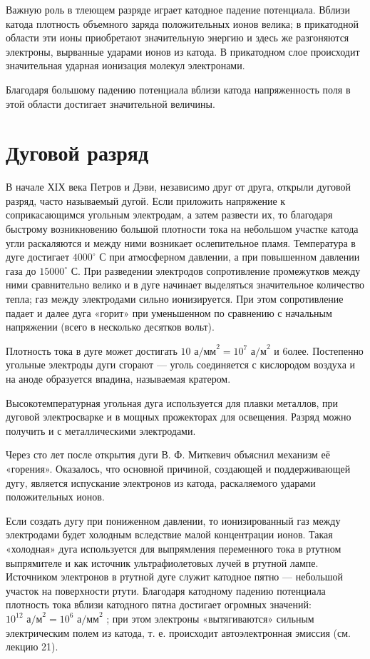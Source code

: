 \documentclass[a4paper,10pt]{book}
\begin{document}
Важную роль в тлеющем разряде играет катодное падение потенциала. Вблизи катода плотность объемного заряда положительных ионов велика; в прикатодной области эти ионы приобретают значительную энергию и здесь же разгоняются электроны, вырванные ударами ионов из катода. В прикатодном слое происходит значительная ударная ионизация молекул электронами.

Благодаря большому падению потенциала вблизи катода напряженность поля в этой области достигает значительной величины.

\section{Дуговой разряд}

В начале ХIХ века Петров и Дэви, независимо друг от друга, открыли дуговой разряд, часто называемый дугой. Если приложить напряжение к соприкасающимся угольным электродам, а затем развести их, то благодаря быстрому возникновению большой плотности тока на небольшом участке катода угли раскаляются и между ними возникает ослепительное пламя. Температура в дуге достигает $4000^{\circ}$ С при атмосферном давлении, а при повышенном давлении газа до $15 000^{\circ}$ С. При разведении электродов сопротивление промежутков между ними сравнительно велико и в дуге начинает выделяться значительное количество тепла; газ между электродами сильно ионизируется. При этом сопротивление падает и далее дуга «горит» при уменьшенном по сравнению с начальным напряжении (всего в несколько десятков вольт).

Плотность тока в дуге может достигать $10\textit{ а/мм}^2 = 10^7\textit{ а/м}^2$ и 6олее. Постепенно угольные электроды дуги сгорают — уголь соединяется с кислородом воздуха и на аноде образуется впадина, называемая кратером.

Высокотемпературная угольная дуга используется для плавки металлов, при дуговой электросварке и в мощных прожекторах для освещения. Разряд можно получить и с металлическими электродами.

Через сто лет после открытия дуги В. Ф. Миткевич объяснил механизм её «горения». Оказалось, что основной причиной, создающей и поддерживающей дугу, является испускание электронов из катода, раскаляемого ударами положительных ионов.

Если создать дугу при пониженном давлении, то ионизированный газ между электродами будет холодным вследствие малой концентрации ионов. Такая «холодная» дуга используется для выпрямления переменного тока в ртутном выпрямителе и как источник ультрафиолетовых лучей в ртутной лампе. Источником электронов в ртутной дуге служит катодное пятно — небольшой участок на поверхности ртути. Благодаря катодному падению потенциала плотность тока вблизи катодного пятна достигает огромных значений: $10^{12}\textit{ а/м}^2 = 10^6\textit{ а/мм}^2$ ; при этом электроны «вытягиваются» сильным электрическим полем из катода, т. е. происходит автоэлектронная эмиссия (см. лекцию 21).
\end{document}
